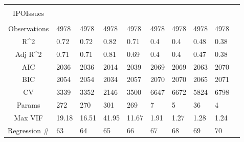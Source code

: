 \documentclass{article}
\begin{document}
\begin{table}[H]
\begin{tabular}{|clllllllll|}
   &  &  &  &  &  &  &  &  & \\ 
  IPOIssues &  &  &  &  &  &  &  &  & \\ 
   &  &  &  &  &  &  &  &  & \\ 
  \hline 
 Observations & 4978 & 4978 & 4978 & 4978 & 4978 & 4978 & 4978 & 4978 & \\ 
  R^2 & 0.72 & 0.72 & 0.82 & 0.71 & 0.4 & 0.4 & 0.48 & 0.38 & \\ 
  Adj R^2 & 0.71 & 0.71 & 0.81 & 0.69 & 0.4 & 0.4 & 0.47 & 0.38 & \\ 
  AIC & 2036 & 2036 & 2014 & 2039 & 2069 & 2069 & 2063 & 2070 & \\ 
  BIC & 2054 & 2054 & 2034 & 2057 & 2070 & 2070 & 2065 & 2071 & \\ 
  CV & 3339 & 3352 & 2146 & 3500 & 6647 & 6672 & 5824 & 6798 & \\ 
  Params & 272 & 270 & 301 & 269 & 7 & 5 & 36 & 4 & \\ 
  Max VIF & 19.18 & 16.51 & 41.95 & 11.67 & 1.91 & 1.27 & 1.28 & 1.24 & \\ 
  Regression \# & 63 & 64 & 65 & 66 & 67 & 68 & 69 & 70 & \\ 
   \hline
\end{tabular}
 
\end{table}
\end{document}
